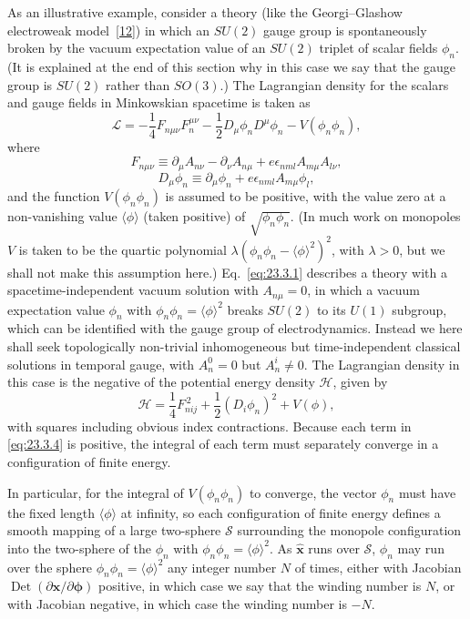 As an illustrative example, consider a theory (like the Georgi--Glashow
electroweak model~\hyperref[ch23-ref-12]{[12]}) in which an $SU(2)$ gauge
group is spontaneously broken by the vacuum expectation value of an
$SU(2)$ triplet of scalar fields $\phi_n$. (It is explained at the end of
this section why in this case we say that the gauge group is $SU(2)$
rather than $SO(3)$.) The Lagrangian density for the scalars and gauge
fields in Minkowskian spacetime is taken as
\begin{equation}
 \mathcal L=-\frac14F_{n\mu\nu}F_n^{\mu\nu}
 -\frac12D_\mu\phi_nD^\mu\phi_n-V(\phi_n\phi_n),
 \tag{23.3.1}\label{eq:23.3.1}
\end{equation}
where
\begin{equation}
 F_{n\mu\nu}\equiv
 \partial_\mu A_{n\nu}-\partial_\nu A_{n\mu}
 +e\epsilon_{nml}A_{m\mu}A_{l\nu},
 \tag{23.3.2}\label{eq:23.3.2}
\end{equation}
\begin{equation}
 D_\mu\phi_n\equiv
 \partial_\mu\phi_n+e\epsilon_{nml}A_{m\mu}\phi_l,
 \tag{23.3.3}\label{eq:23.3.3}
\end{equation}
and the function $V(\phi_n\phi_n)$ is assumed to be positive, with the
value zero at a non-vanishing value $\langle\phi\rangle$ (taken positive)
of $\sqrt{\phi_n\phi_n}$. (In much work on monopoles $V$ is taken to be
the quartic polynomial
$\lambda(\phi_n\phi_n-\langle\phi\rangle^2)^2$, with $\lambda>0$, but we
shall not make this assumption here.) Eq.~\eqref{eq:23.3.1} describes a
theory with a spacetime-independent vacuum solution with $A_{n\mu}=0$,
in which a vacuum expectation value $\phi_n$ with
$\phi_n\phi_n=\langle\phi\rangle^2$ breaks $SU(2)$ to its $U(1)$
subgroup, which can be identified with the gauge group of electrodynamics.
Instead we here shall seek topologically non-trivial inhomogeneous but
time-independent classical solutions in temporal gauge, with $A_n^0=0$
but $A_n^i\ne0$. The Lagrangian density in this case is the negative of
the potential energy density $\mathcal H$, given by
\begin{equation}
 \mathcal H=\frac14F_{nij}^{\,2}
 +\frac12(D_i\phi_n)^2+V(\phi),
 \tag{23.3.4}\label{eq:23.3.4}
\end{equation}
with squares including obvious index contractions. Because each term in
\eqref{eq:23.3.4} is positive, the integral of each term must separately
converge in a configuration of finite energy.

In particular, for the integral of $V(\phi_n\phi_n)$ to converge, the
vector $\phi_n$ must have the fixed length $\langle\phi\rangle$ at
infinity, so each configuration of finite energy defines a smooth mapping
of a large two-sphere $\mathcal S$ surrounding the monopole configuration
into the two-sphere of the $\phi_n$ with
$\phi_n\phi_n=\langle\phi\rangle^2$. As $\hat{\mathbf x}$ runs over
$\mathcal S$, $\phi_n$ may run over the sphere
$\phi_n\phi_n=\langle\phi\rangle^2$ any integer number $N$ of times,
either with Jacobian
$\operatorname{Det}(\partial\mathbf x/\partial\boldsymbol\phi)$ positive,
in which case we say that the winding number is $N$, or with Jacobian
negative, in which case the winding number is $-N$.


